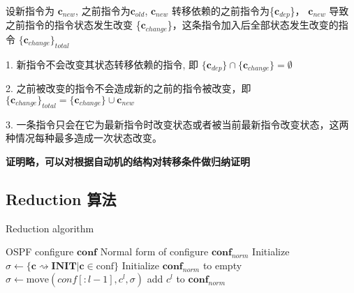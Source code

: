 \documentclass{article}
\begin{document}
设新指令为 $\textbf{c}_{new}$, 之前指令为{$\textbf{c}_{old}$}, $\textbf{c}_{new}$ 转移依赖的之前指令为\{$\textbf{c}_{dep}$\}， $\textbf{c}_{new}$ 导致之前指令的指令状态发生改变 \{$\textbf{c}_{change}$\}，这条指令加入后全部状态发生改变的指令 $\{\textbf{c}_{change}\}_{total}$

1. 新指令不会改变其状态转移依赖的指令, 即 $\{\textbf{c}_{dep}\} \cap  \{\textbf{c}_{change}\} = \emptyset$

2. 之前被改变的指令不会造成新的之前的指令被改变，即 $\{\textbf{c}_{change}\}_{total} = \{\textbf{c}_{change}\} \cup \textbf{c}_{new}$

3. 一条指令只会在它为最新指令时改变状态或者被当前最新指令改变状态，这两种情况每种最多造成一次状态改变。

\textbf{证明略，可以对根据自动机的结构对转移条件做归纳证明}

\subsection{Reduction 算法}
\begin{algorithm}
\caption{Reduction algorithm}
\begin{algorithmic}[1]
\Require OSPF configure $\textbf{conf}$
\Ensure Normal form of configure $\textbf{conf}_{norm}$
\State Initialize $\sigma \gets \{\textbf{c} \rightsquigarrow \textbf{INIT} | \textbf{c} \in \text{conf}\}$  
\State Initialize $\textbf{conf}_{norm}$ to empty
    \State $\sigma \gets \text{move}(conf[:l-1], c^l, \sigma)$ 
\EndFor
{}
        \State add $c^l$ to $\textbf{conf}_{norm}$
    \EndIf
\EndFor
\end{algorithmic}
\end{algorithm}

\end{document}
